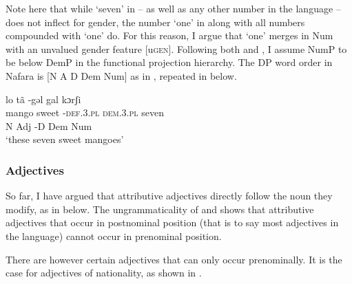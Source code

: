 \documentclass[output=paper]{langscibook}
\begin{document}
Note here that while ‘seven’ in  – as well as any other number in the language – does not inflect for gender, the number ‘one’ in  along with all numbers compounded with ‘one’ do. For this reason, I argue that ‘one’ merges in Num with an unvalued gender feature [u\textsc{gen}]. Following both \citet{Greenberg1963} and \citet{Cinque2005}, I assume NumP to be below DemP in the functional projection hierarchy. The DP word order in Nafara is [N A D Dem Num] as in , repeated in  below.

 
\ea\label{ex:baron:8}
\glll lo  tã -gəl  gal  kɔrʃi\\
mango sweet -\textsc{def.3.pl} \textsc{dem.3.pl} seven\\
N  Adj  -D  Dem  Num\\
\glt ‘these seven sweet mangoes’
\z


\subsubsection{Adjectives}
\label{sec:baron:2.1.5}
So far, I have argued that attributive adjectives directly follow the noun they modify, as in  below. The ungrammaticality of  and  shows that attributive adjectives that occur in postnominal position (that is to say most adjectives in the language) cannot occur in prenominal position.
 
\ea\label{ex:baron:9}
\begin{multicols}{2}
 

\z
\end{multicols}
\z

There are however certain adjectives that can only occur prenominally. It is the case for adjectives of nationality, as shown in .
\end{document}
